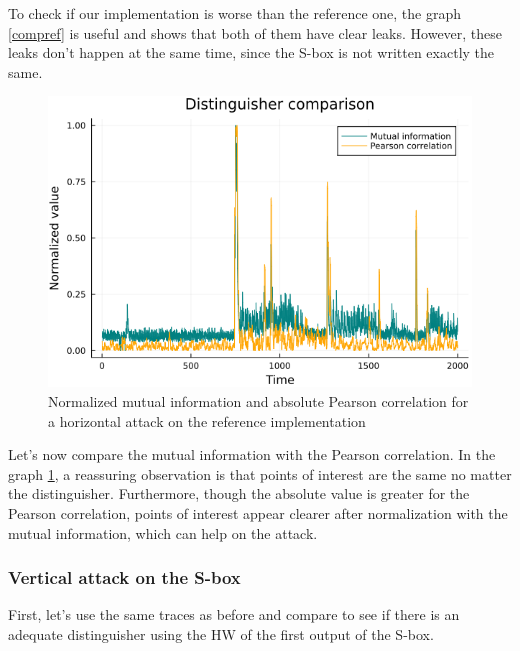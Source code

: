 \documentclass[a4paper,11pt,twocolumn]{article}
\begin{document}
	To check if our implementation is worse than the reference one, the graph \ref{compref} is useful and shows that both of them have clear leaks. However, these leaks don't happen at the same time, since the S-box is not written exactly the same. 
	
	\begin{figure}[H]
		\centering
		\includegraphics[scale=0.4]{corr_vs_MI_hHW}
		\caption{Normalized mutual information and absolute Pearson correlation for a horizontal attack on the reference implementation}
		\label{corvsMI}
	\end{figure}
	
	Let's now compare the mutual information with the Pearson correlation. In the graph \ref{corvsMI}, a reassuring observation is that points of interest are the same no matter the distinguisher. Furthermore, though the absolute value is greater for the Pearson correlation, points of interest appear clearer after normalization with the mutual information, which can help on the attack.
	
	\subsubsection{Vertical attack on the S-box}
	First, let's use the same traces as before and compare to see if there is an adequate distinguisher using the HW of the first output of the S-box.
	
\end{document}
